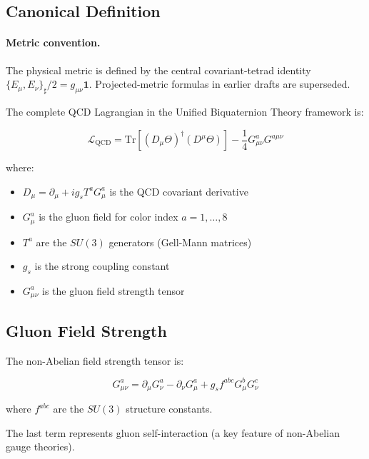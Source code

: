 \subsection{Canonical Definition}

\paragraph{Metric convention.} The physical metric is defined by the central covariant-tetrad identity $\{E_\mu,E_\nu\}_\sharp/2=g_{\mu\nu}\mathbf1$.  Projected-metric formulas in earlier drafts are superseded.

The complete QCD Lagrangian in the Unified Biquaternion Theory framework is:

\begin{equation}
\label{eq:canonical:qcd_lagrangian}
\boxed{\mathcal{L}_{\text{QCD}} = \text{Tr}\left[(D_\mu\Theta)^\dagger (D^\mu\Theta)\right] - \frac{1}{4} G^a_{\mu\nu} G^{a\mu\nu}}
\end{equation}

\noindent where:
\begin{itemize}
    \item $D_\mu = \partial_\mu + ig_s T^a G^a_\mu$ is the QCD covariant derivative
    \item $G^a_\mu$ is the gluon field for color index $a = 1, \ldots, 8$
    \item $T^a$ are the $SU(3)$ generators (Gell-Mann matrices)
    \item $g_s$ is the strong coupling constant
    \item $G^a_{\mu\nu}$ is the gluon field strength tensor
\end{itemize}

\subsection{Gluon Field Strength}

The non-Abelian field strength tensor is:

\begin{equation}
\label{eq:canonical:gluon_field_strength}
G^a_{\mu\nu} = \partial_\mu G^a_\nu - \partial_\nu G^a_\mu + g_s f^{abc} G^b_\mu G^c_\nu
\end{equation}

\noindent where $f^{abc}$ are the $SU(3)$ structure constants.

The last term represents gluon self-interaction (a key feature of non-Abelian gauge theories).

